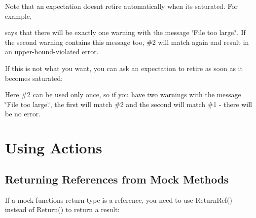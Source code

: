 Note that an expectation doesn\textquotesingle{}t retire automatically when it\textquotesingle{}s saturated. For example,


\begin{DoxyCode}{0}
\end{DoxyCode}


says that there will be exactly one warning with the message {\ttfamily \char`\"{}\+File
too large.\char`\"{}}. If the second warning contains this message too, \#2 will match again and result in an upper-\/bound-\/violated error.

If this is not what you want, you can ask an expectation to retire as soon as it becomes saturated\+:


\begin{DoxyCode}{0}
\end{DoxyCode}


Here \#2 can be used only once, so if you have two warnings with the message {\ttfamily \char`\"{}\+File too large.\char`\"{}}, the first will match \#2 and the second will match \#1 -\/ there will be no error.

\section*{Using Actions}

\subsection*{Returning References from Mock Methods}

If a mock function\textquotesingle{}s return type is a reference, you need to use {\ttfamily Return\+Ref()} instead of {\ttfamily Return()} to return a result\+:


\begin{DoxyCode}{0}
\DoxyCodeLine{}
\DoxyCodeLine{\};}
\DoxyCodeLine{}
\end{DoxyCode}



